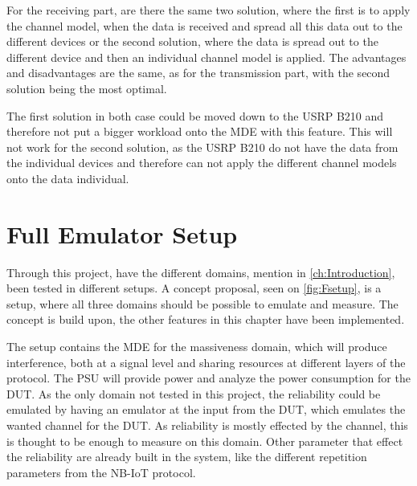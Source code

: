 For the receiving part, are there the same two solution, where the first is to apply the channel model, when the data is received and spread all this data out to the different devices or the second solution, where the data is spread out to the different device and then an individual channel model is applied. The advantages and disadvantages are the same, as for the transmission part, with the second solution being the most optimal.

The first solution in both case could be moved down to the USRP B210 and therefore not put a bigger workload onto the MDE with this feature. This will not work for the second solution, as the USRP B210 do not have the data from the individual devices and therefore can not apply the different channel models onto the data individual.


\section{Full Emulator Setup}
Through this project, have the different domains, mention in \autoref{ch:Introduction}, been tested in different setups. A concept proposal, seen on \autoref{fig:Fsetup}, is a setup, where all three domains should be possible to emulate and measure. The concept is build upon, the other features in this chapter have been implemented. 


The setup contains the MDE for the massiveness domain, which will produce interference, both at a signal level and sharing resources at different layers of the protocol. The PSU will provide power and analyze the power consumption for the DUT. As the only domain not tested in this project, the reliability could be emulated by having an emulator at the input from the DUT, which emulates the wanted channel for the DUT. As reliability is mostly effected by the channel, this is thought to be enough to measure on this domain. Other parameter that effect the reliability are already built in the system, like the different repetition parameters from the NB-IoT protocol.

